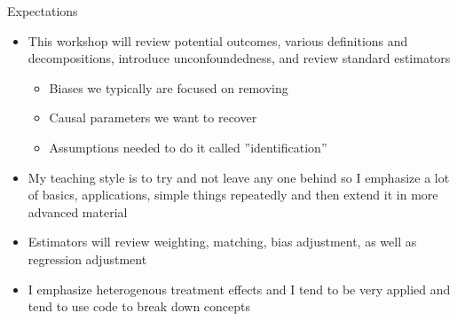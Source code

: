 \documentclass{beamer}
\begin{document}
\begin{frame}{Expectations}

  \begin{itemize}
    \item This workshop will review potential outcomes, various definitions and decompositions, introduce unconfoundedness, and review standard estimators
    	\begin{itemize}
	\item Biases we typically are focused on removing
	\item Causal parameters we want to recover
	\item Assumptions needed to do it called ''identification''
	\end{itemize}
    \item My teaching style is to try and not leave any one behind so I emphasize a lot of basics, applications, simple things repeatedly and then extend it in more advanced material
    \item Estimators will review weighting, matching, bias adjustment, as well as regression adjustment
    \item I emphasize heterogenous treatment effects and I tend to be very applied and tend to use code to break down concepts
  \end{itemize}

\end{frame}
\end{document}
